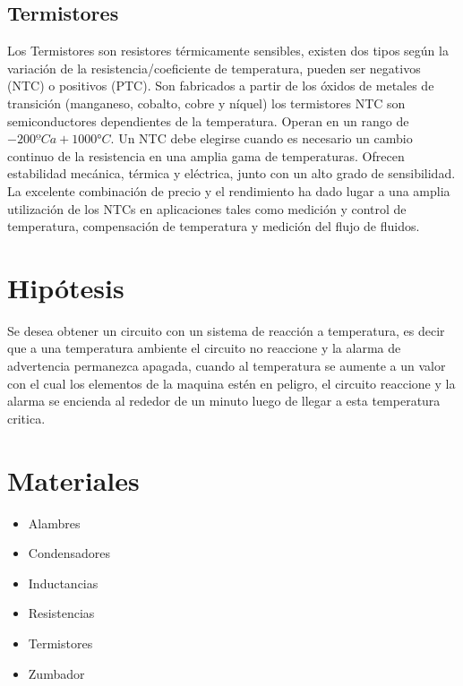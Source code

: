 \documentclass[twocolumn]{IEEEtran}
\begin{document}
\subsection{Termistores}
\noindent
Los Termistores son resistores térmicamente sensibles, existen dos tipos según la variación de la resistencia/coeficiente de temperatura, pueden ser negativos (NTC) o positivos (PTC).
Son fabricados a partir de los óxidos de metales de transición (manganeso, cobalto, cobre y níquel) los termistores NTC  son semiconductores dependientes de la temperatura. Operan en un rango de $-200º C a + 1000° C$. Un NTC debe elegirse cuando es necesario un cambio continuo de la resistencia en una amplia gama de temperaturas. Ofrecen estabilidad mecánica,  térmica y eléctrica, junto con un alto grado de sensibilidad.\\
La excelente combinación de precio y el rendimiento ha dado lugar a una amplia utilización de los NTCs en aplicaciones  tales como medición y control de temperatura, compensación de temperatura y medición del flujo de fluidos.

\section{Hipótesis}
\noindent
Se desea obtener un circuito con un sistema de reacción a temperatura, es decir que a una temperatura ambiente el circuito no reaccione y la alarma de advertencia permanezca apagada, cuando al temperatura se aumente a un valor con el cual los elementos de la maquina estén en peligro, el circuito reaccione y la alarma se encienda al rededor de un minuto luego de llegar a esta temperatura critica.

\section{Materiales}
\begin{itemize}
 \item Alambres
 \item Condensadores
 \item Inductancias
 \item Resistencias
 \item Termistores
 \item Zumbador
\end{itemize}
\end{document}
